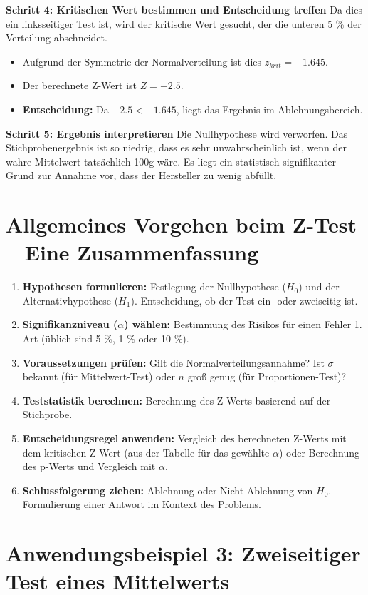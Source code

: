 \textbf{Schritt 4: Kritischen Wert bestimmen und Entscheidung treffen}
Da dies ein linksseitiger Test ist, wird der kritische Wert gesucht, der die unteren 5 \% der Verteilung abschneidet.
\begin{itemize}
    \item Aufgrund der Symmetrie der Normalverteilung ist dies $z_{krit} = -1.645$.
    \item Der berechnete Z-Wert ist $Z = -2.5$.
    \item \textbf{Entscheidung:} Da $-2.5 < -1.645$, liegt das Ergebnis im Ablehnungsbereich.
\end{itemize}

\textbf{Schritt 5: Ergebnis interpretieren}
Die Nullhypothese wird verworfen. Das Stichprobenergebnis ist so niedrig, dass es sehr unwahrscheinlich ist, wenn der wahre Mittelwert tatsächlich 100g wäre. Es liegt ein statistisch signifikanter Grund zur Annahme vor, dass der Hersteller zu wenig abfüllt.

\section{Allgemeines Vorgehen beim Z-Test – Eine Zusammenfassung}
\begin{enumerate}
    \item \textbf{Hypothesen formulieren:} Festlegung der Nullhypothese ($H_0$) und der Alternativhypothese ($H_1$). Entscheidung, ob der Test ein- oder zweiseitig ist.
    \item \textbf{Signifikanzniveau ($\alpha$) wählen:} Bestimmung des Risikos für einen Fehler 1. Art (üblich sind 5 \%, 1 \% oder 10 \%).
    \item \textbf{Voraussetzungen prüfen:} Gilt die Normalverteilungsannahme? Ist $\sigma$ bekannt (für Mittelwert-Test) oder $n$ groß genug (für Proportionen-Test)?
    \item \textbf{Teststatistik berechnen:} Berechnung des Z-Werts basierend auf der Stichprobe.
    \item \textbf{Entscheidungsregel anwenden:} Vergleich des berechneten Z-Werts mit dem kritischen Z-Wert (aus der Tabelle für das gewählte $\alpha$) oder Berechnung des p-Werts und Vergleich mit $\alpha$.
    \item \textbf{Schlussfolgerung ziehen:} Ablehnung oder Nicht-Ablehnung von $H_0$. Formulierung einer Antwort im Kontext des Problems.
\end{enumerate}

\section{Anwendungsbeispiel 3: Zweiseitiger Test eines Mittelwerts}

